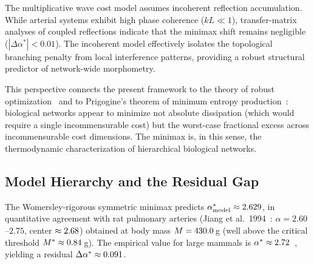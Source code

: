 \begin{remark}
The multiplicative wave cost model assumes incoherent reflection accumulation.
While arterial systems exhibit high phase coherence ($kL \ll 1$),
transfer-matrix analyses of coupled reflections indicate that the minimax
shift remains negligible ($|\Delta\alpha^*| < 0.01$). The incoherent model
effectively isolates the topological branching penalty from local interference
patterns, providing a robust structural predictor of network-wide morphometry.
\end{remark}

This perspective connects the present framework to the theory of robust
optimization~\cite{ben-tal2009} and to Prigogine's theorem of minimum entropy
production~\cite{prigogine1967}: biological networks appear to minimize not
absolute dissipation (which would require a single incommensurable cost) but the
worst-case fractional excess across incommensurable cost dimensions. The minimax
is, in this sense, the thermodynamic characterization of hierarchical biological
networks.

\subsection{Model Hierarchy and the Residual Gap}
\label{sec:gap}

The Womersley-rigorous symmetric minimax predicts $\alpha^*_{\mathrm{model}}
\approx 2.629$, in quantitative agreement with rat pulmonary
arteries (Jiang et al.~1994~\cite{jiang1994}: $\alpha = 2.60$--$2.75$, center
$\approx 2.68$) obtained at body mass $M = 430.0\,$g (well
above the critical threshold $M^* \approx 0.84\,$g). The empirical value
for large mammals is $\alpha^* \approx 2.72$~\cite{kassab1993},
yielding a residual $\Delta\alpha^* \approx 0.091$.

